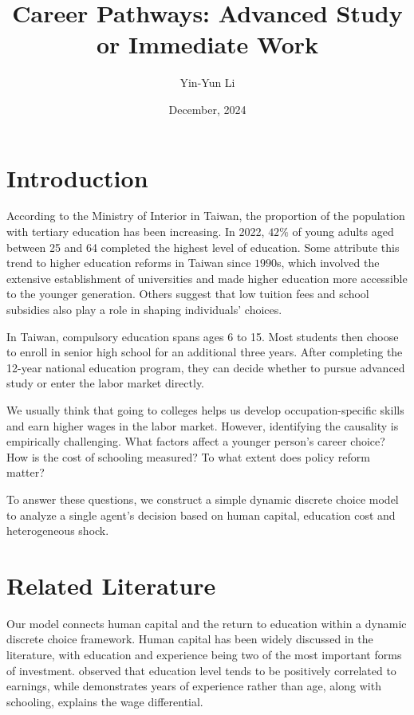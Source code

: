 \documentclass[a4paper, 12pt]{article}
\title{\large{Career Pathways: Advanced Study or Immediate Work}}
\author{Yin-Yun Li}
\date{December, 2024}
\begin{document}
\maketitle

\section{Introduction}

According to the Ministry of Interior in Taiwan, the proportion of the population with tertiary education has been increasing. In 2022, $42\%$ of young adults aged between 25 and 64 completed the highest level of education. 
Some attribute this trend to higher education reforms in Taiwan since $1990$s, which involved the extensive establishment of universities and made higher education more accessible to the younger generation. 
Others suggest that low tuition fees and school subsidies also play a role in shaping individuals' choices. 

In Taiwan, compulsory education spans ages 6 to 15. Most students then choose to enroll in senior high school for an additional three years. 
After completing the 12-year national education program, they can decide whether to pursue advanced study or enter the labor market directly.

We usually think that going to colleges helps us develop occupation-specific skills and earn higher wages in the labor market. 
However, identifying the causality is empirically challenging.
What factors affect a younger person's career choice? 
How is the cost of schooling measured?
To what extent does policy reform matter?

To answer these questions, we construct a simple dynamic discrete choice model to analyze a single agent's decision based on human capital, education cost and heterogeneous shock. 

\section{Related Literature}

Our model connects human capital and the return to education within a dynamic discrete choice framework. 
Human capital has been widely discussed in the literature, with education and experience being two of the most important forms of investment. 
\cite{becker1964human} observed that education level tends to be positively correlated to earnings, 
while \cite{mincer1974schooling} demonstrates years of experience rather than age, along with schooling, explains the wage differential.
\end{document}
